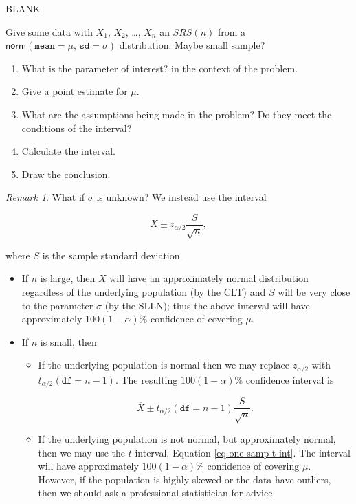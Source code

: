 \documentclass[]{book}
\providecommand{\tightlist}{%
  \setlength{\itemsep}{0pt}\setlength{\parskip}{0pt}}
\numberwithin{equation}{chapter}
\numberwithin{figure}{chapter}
\theoremstyle{plain}
\theoremstyle{definition}
\theoremstyle{remark}
\theoremstyle{definition}
\theoremstyle{definition}
\theoremstyle{remark}
\newtheorem*{remark}{Remark}
\let\BeginKnitrBlock\begin \let\EndKnitrBlock\end
\begin{document}
BLANK

\bigskip

\BeginKnitrBlock{example}
\protect\hypertarget{ex:unnamed-chunk-358}{}{\label{ex:unnamed-chunk-358}}Give
some data with \(X_{1}\), \(X_{2}\), \ldots{}, \(X_{n}\) an \(SRS(n)\)
from a \(\mathsf{norm}(\mathtt{mean}=\mu,\,\mathtt{sd}=\sigma)\)
distribution. Maybe small sample?
\EndKnitrBlock{example}

\begin{enumerate}
\def\labelenumi{\arabic{enumi}.}
\tightlist
\item
  What is the parameter of interest? in the context of the problem.
\item
  Give a point estimate for \(\mu\).
\item
  What are the assumptions being made in the problem? Do they meet the
  conditions of the interval?
\item
  Calculate the interval.
\item
  Draw the conclusion.
\end{enumerate}

\bigskip

\begin{remark}
What if \(\sigma\) is unknown? We instead use the interval

\begin{equation}
\overline{X}\pm z_{\alpha/2}\frac{S}{\sqrt{n}},
\end{equation}

where \(S\) is the sample standard deviation.

\begin{itemize}
\tightlist
\item
  If \(n\) is large, then \(\overline{X}\) will have an approximately
  normal distribution regardless of the underlying population (by the
  CLT) and \(S\) will be very close to the parameter \(\sigma\) (by the
  SLLN); thus the above interval will have approximately
  \(100(1-\alpha)\%\) confidence of covering \(\mu\).
\item
  If \(n\) is small, then

  \begin{itemize}
  \tightlist
  \item
    If the underlying population is normal then we may replace
    \(z_{\alpha/2}\) with \(t_{\alpha/2}(\mathtt{df}=n-1)\). The
    resulting \(100(1-\alpha)\%\) confidence interval is

    \begin{equation}
      \label{eq-one-samp-t-int}
      \overline{X}\pm t_{\alpha/2}(\mathtt{df}=n-1)\frac{S}{\sqrt{n}}.
      \end{equation}
  \item
    If the underlying population is not normal, but approximately
    normal, then we may use the \(t\) interval, Equation
    \eqref{eq-one-samp-t-int}. The interval will have approximately
    \(100(1-\alpha)\%\) confidence of covering \(\mu\). However, if the
    population is highly skewed or the data have outliers, then we
    should ask a professional statistician for advice.
  \end{itemize}
\end{itemize}
\end{remark}
\end{document}
